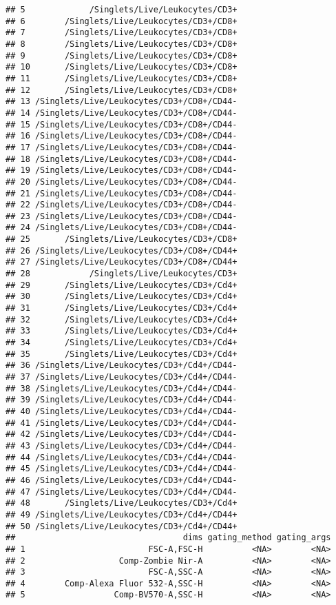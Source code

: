 \documentclass[]{book}
\begin{document}
\begin{verbatim}
## 5             /Singlets/Live/Leukocytes/CD3+
## 6        /Singlets/Live/Leukocytes/CD3+/CD8+
## 7        /Singlets/Live/Leukocytes/CD3+/CD8+
## 8        /Singlets/Live/Leukocytes/CD3+/CD8+
## 9        /Singlets/Live/Leukocytes/CD3+/CD8+
## 10       /Singlets/Live/Leukocytes/CD3+/CD8+
## 11       /Singlets/Live/Leukocytes/CD3+/CD8+
## 12       /Singlets/Live/Leukocytes/CD3+/CD8+
## 13 /Singlets/Live/Leukocytes/CD3+/CD8+/CD44-
## 14 /Singlets/Live/Leukocytes/CD3+/CD8+/CD44-
## 15 /Singlets/Live/Leukocytes/CD3+/CD8+/CD44-
## 16 /Singlets/Live/Leukocytes/CD3+/CD8+/CD44-
## 17 /Singlets/Live/Leukocytes/CD3+/CD8+/CD44-
## 18 /Singlets/Live/Leukocytes/CD3+/CD8+/CD44-
## 19 /Singlets/Live/Leukocytes/CD3+/CD8+/CD44-
## 20 /Singlets/Live/Leukocytes/CD3+/CD8+/CD44-
## 21 /Singlets/Live/Leukocytes/CD3+/CD8+/CD44-
## 22 /Singlets/Live/Leukocytes/CD3+/CD8+/CD44-
## 23 /Singlets/Live/Leukocytes/CD3+/CD8+/CD44-
## 24 /Singlets/Live/Leukocytes/CD3+/CD8+/CD44-
## 25       /Singlets/Live/Leukocytes/CD3+/CD8+
## 26 /Singlets/Live/Leukocytes/CD3+/CD8+/CD44+
## 27 /Singlets/Live/Leukocytes/CD3+/CD8+/CD44+
## 28            /Singlets/Live/Leukocytes/CD3+
## 29       /Singlets/Live/Leukocytes/CD3+/Cd4+
## 30       /Singlets/Live/Leukocytes/CD3+/Cd4+
## 31       /Singlets/Live/Leukocytes/CD3+/Cd4+
## 32       /Singlets/Live/Leukocytes/CD3+/Cd4+
## 33       /Singlets/Live/Leukocytes/CD3+/Cd4+
## 34       /Singlets/Live/Leukocytes/CD3+/Cd4+
## 35       /Singlets/Live/Leukocytes/CD3+/Cd4+
## 36 /Singlets/Live/Leukocytes/CD3+/Cd4+/CD44-
## 37 /Singlets/Live/Leukocytes/CD3+/Cd4+/CD44-
## 38 /Singlets/Live/Leukocytes/CD3+/Cd4+/CD44-
## 39 /Singlets/Live/Leukocytes/CD3+/Cd4+/CD44-
## 40 /Singlets/Live/Leukocytes/CD3+/Cd4+/CD44-
## 41 /Singlets/Live/Leukocytes/CD3+/Cd4+/CD44-
## 42 /Singlets/Live/Leukocytes/CD3+/Cd4+/CD44-
## 43 /Singlets/Live/Leukocytes/CD3+/Cd4+/CD44-
## 44 /Singlets/Live/Leukocytes/CD3+/Cd4+/CD44-
## 45 /Singlets/Live/Leukocytes/CD3+/Cd4+/CD44-
## 46 /Singlets/Live/Leukocytes/CD3+/Cd4+/CD44-
## 47 /Singlets/Live/Leukocytes/CD3+/Cd4+/CD44-
## 48       /Singlets/Live/Leukocytes/CD3+/Cd4+
## 49 /Singlets/Live/Leukocytes/CD3+/Cd4+/CD44+
## 50 /Singlets/Live/Leukocytes/CD3+/Cd4+/CD44+
##                                  dims gating_method gating_args
## 1                         FSC-A,FSC-H          <NA>        <NA>
## 2                   Comp-Zombie Nir-A          <NA>        <NA>
## 3                         FSC-A,SSC-A          <NA>        <NA>
## 4        Comp-Alexa Fluor 532-A,SSC-H          <NA>        <NA>
## 5                  Comp-BV570-A,SSC-H          <NA>        <NA>

\end{verbatim}
\end{document}
